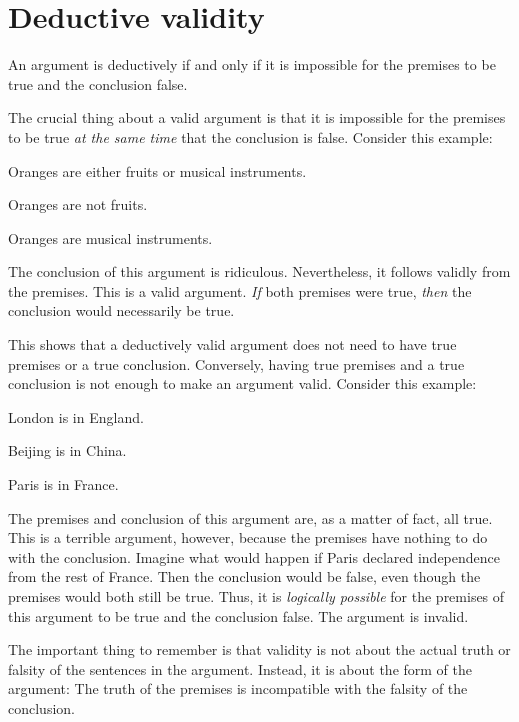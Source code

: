 \section{Deductive validity}
An argument is deductively  if and only if it is impossible for the premises to be true and the conclusion false.

The crucial thing about a valid argument is that it is impossible for the premises to be true \emph{at the same time} that the conclusion is false. Consider this example:

\begin{earg}
\item[] Oranges are either fruits or musical instruments.
\item[] Oranges are not fruits.
\item[\therefore] Oranges are musical instruments.
\end{earg}

The conclusion of this argument is ridiculous. Nevertheless, it follows validly from the premises. This is a valid argument. \emph{If} both premises were true, \emph{then} the conclusion would necessarily be true.

This shows that a deductively valid argument does not need to have true premises or a true conclusion. Conversely, having true premises and a true conclusion is not enough to make an argument valid. Consider this example:

\begin{earg}
\item[] London is in England.
\item[] Beijing is in China.
\item[\therefore] Paris is in France.
\end{earg}



The premises and conclusion of this argument are, as a matter of fact, all true. This is a terrible argument, however, because the premises have nothing to do with the conclusion. Imagine what would happen if Paris declared independence from the rest of France. Then the conclusion would be false, even though the premises would both still be true. Thus, it is \emph{logically possible} for the premises of this argument to be true and the conclusion false. The argument is invalid.

The important thing to remember is that validity is not about the actual truth or falsity of the sentences in the argument. Instead, it is about the form of the argument: The truth of the premises is incompatible with the falsity of the conclusion.


